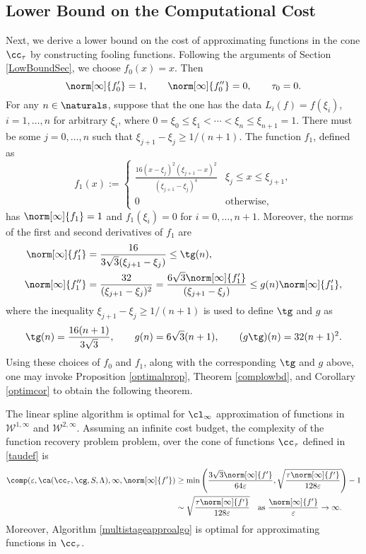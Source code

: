 \subsection{Lower Bound on the Computational Cost}
Next, we derive a lower bound on the cost of approximating functions in the cone $\cc_{\tau}$ by constructing fooling functions. Following the arguments of Section \ref{LowBoundSec}, we choose  $f_0(x)=x.$ Then
\[
\norm[\infty]{f'_0}=1, \qquad \norm[\infty]{f''_0}=0, \qquad \tau_0=0.
\]
For any $n \in \naturals$, suppose that the one has the data $L_i(f)=f(\xi_i)$, $i=1, \ldots, n$ for arbitrary $\xi_i$, where $0=\xi_0 \le \xi_1 < \cdots < \xi_n \le \xi_{n+1} = 1$.  There must be some $j=0, \ldots, n$ such that $\xi_{j+1} - \xi_j \ge 1/(n+1)$.  The function $f_{1}$, defined as
$$
f_{1}(x):=\begin{cases} \displaystyle
\frac{16(x-\xi_{j})^{2}(\xi_{j+1}-x)^{2}}{(\xi_{j+1}-\xi_{j})^4} & \xi_{j} \le x \leq \xi_{j+1},\\
0 & \text{otherwise},
\end{cases}
$$
has $\norm[\infty]{f_1}=1$ and $f_1(\xi_i)=0$ for $i=0, \ldots, n+1$.  Moreover, the norms of the first and second derivatives of $f_1$ are
\begin{align*}
\norm[\infty]{f'_1}&=\frac{16}{3\sqrt{3}(\xi_{j+1}-\xi_{j})}\leq \tg(n),\\
\norm[\infty]{f''_1}&=\frac{32}{(\xi_{j+1}-\xi_{j})^2}
=\frac{6\sqrt{3}\norm[\infty]{f'_1}}{(\xi_{j+1}-\xi_{j})}
 \leq g(n) \norm[\infty]{f'_1},
\end{align*}
where the inequality $\xi_{j+1} - \xi_j \ge 1/(n+1)$ is used to define $\tg$ and $g$ as
\[
\tg(n) = \frac{16(n+1)}{3\sqrt{3}}, \qquad g(n) = 6\sqrt{3}(n+1), \qquad (g\tg)(n) = 32(n+1)^2.
\]
Using these choices of $f_0$ and $f_1$, along with the corresponding $\tg$ and $g$ above, one may invoke Proposition \ref{optimalprop}, Theorem \ref{complowbd}, and Corollary \ref{optimcor} to obtain the following theorem.

\begin{theorem} \label{complowbdappr} The linear spline algorithm is optimal for $\cl_{\infty}$ approximation of functions in $\mathcal{W}^{1,\infty}$ and $\mathcal{W}^{2,\infty}$. Assuming an infinite cost budget, the complexity of the function recovery problem problem, over the cone of functions $\cc_{\tau}$ defined in \eqref{taudef} is
\begin{align*}
\comp(\varepsilon,\ca(\cc_{\tau},\cg,S,\Lambda),\infty,\norm[\infty]{f'})
&\ge \min\left(\frac{3\sqrt{3}\norm[\infty]{f'}}{64 \varepsilon}, \sqrt{\frac{\tau\norm[\infty]{f'}}{128\varepsilon}} \right)-1\\
& \sim \sqrt{\frac{\tau\norm[\infty]{f'}}{128\varepsilon}}  \quad\text{as } \frac{\norm[\infty]{f'}}{\varepsilon} \to \infty.
\end{align*}
Moreover, Algorithm \ref{multistageapproalgo} is optimal for approximating functions in $\cc_{\tau}$.
\end{theorem}

